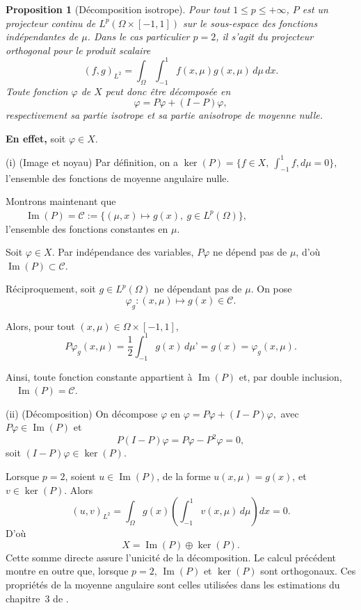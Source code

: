 \documentclass{article}
\newtheorem{proposition}[theorem]{Proposition}
\begin{document}
\begin{proposition}[Décomposition isotrope]
    Pour tout $1\leq p\leq+\infty$, $P$ est un projecteur continu de $L^p(\Omega\times[-1,1])$ sur le sous-espace des fonctions indépendantes de $\mu$. Dans le cas particulier $p=2$, il s'agit du projecteur orthogonal pour le produit scalaire
    \[ (f,g)_{L^2}=\int_\Omega\int_{-1}^1 f(x,\mu)g(x,\mu)\,d\mu\,dx.\]
    Toute fonction $\varphi$ de $X$ peut donc être décomposée en
    \[\varphi =P\varphi+(I-P)\varphi,\]
    respectivement sa partie isotrope et sa partie anisotrope de moyenne nulle.
\end{proposition}


\textbf{En effet,} soit $\varphi\in X$.

\medskip

(i) (Image et noyau) Par définition, on a $\ker(P) =\{f\in X,\ \int_{-1}^1f,d\mu=0\},$  l’ensemble des fonctions de moyenne angulaire nulle.

\medskip
Montrons maintenant que $\qquad
\operatorname{Im}(P) =\mathcal C :=
\{(\mu,x)\longmapsto g(x),\ g\in L^p(\Omega)\},
$
\\l’ensemble des fonctions constantes en $\mu$.

Soit $\varphi\in X$. Par indépendance des variables, $P\varphi$ ne dépend pas de $\mu$, d’où $\operatorname{Im}(P)\subset\mathcal C.$

Réciproquement, soit $g\in L^p(\Omega)$ ne dépendant pas de $\mu$. On pose
\[\varphi_g:(x,\mu)\longmapsto g(x)\in\mathcal C.\]

Alors, pour tout $(x,\mu)\in\Omega\times[-1,1]$,
\[
P\varphi_g(x,\mu) = \frac12 \int_{-1}^1g(x)\,d\mu’ =g(x) = \varphi_g(x,\mu).
\]

Ainsi, toute fonction constante appartient à $\operatorname{Im}(P)$ et, par double inclusion, $\quad
\operatorname{Im}(P)=\mathcal C.$

\bigskip

(ii) (Décomposition) On décompose $\varphi$ en \(\varphi =P\varphi+(I-P)\varphi,\) avec \(P\varphi\in\operatorname{Im}(P)\) et
\[P(I-P)\varphi =P\varphi-P^2\varphi =0,\]
soit \((I-P)\varphi\in\ker(P).\)

\medskip

Lorsque $p=2$, soient $u\in\operatorname{Im}(P)$, de la forme $u(x,\mu)=g(x)$, et $v\in\ker(P)$. Alors
\[
(u,v)_{L^2}
=\int_\Omega g(x)\left(\int_{-1}^1v(x,\mu)\,d\mu\right)dx
=0.
\]
D'où
\[X=\operatorname{Im}(P)\oplus\ker(P).\]
Cette somme directe assure l'unicité de la décomposition. Le calcul précédent montre en outre que, lorsque $p=2$, $\operatorname{Im}(P)$ et $\ker(P)$ sont orthogonaux. Ces propriétés de la moyenne angulaire sont celles utilisées dans les estimations du chapitre~3 de \textcite{Allaire2018}.
\end{document}
